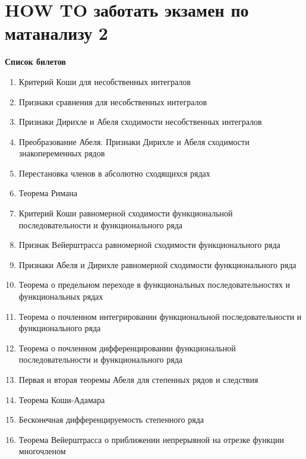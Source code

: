 \documentclass[a4paper]{article}
\author{Васильев Павел}
\begin{document}
\section*{HOW TO заботать экзамен по матанализу 2}

\textbf{Список билетов}
\begin{enumerate}
\item Критерий Коши для несобственных интегралов
\item Признаки сравнения для несобственных интегралов
\item Признаки Дирихле и Абеля сходимости несобственных интегралов
\item Преобразование Абеля. Признаки Дирихле и Абеля сходимости знакопеременных рядов
\item Перестановка членов в абсолютно сходящихся рядах
\item Теорема Римана
\item Критерий Коши равномерной сходимости функциональной последовательности и функционального ряда
\item Признак Вейерштрасса равномерной сходимости функционального ряда
\item Признаки Абеля и Дирихле равномерной сходимости функционального ряда 
\item Теорема о предельном переходе в функциональных последовательностях и функциональных рядах 
\item Теорема о почленном интегрировании функциональной последовательности и функционального ряда
\item Теорема о почленном дифференцировании функциональной последовательности и функционального ряда
\item Первая и вторая теоремы Абеля для степенных рядов и следствия
\item Теорема Коши-Адамара
\item Бесконечная дифференцируемость степенного ряда
\item Теорема Вейерштрасса о приближении непрерывной на отрезке функции многочленом

\end{enumerate} 
\end{document}

